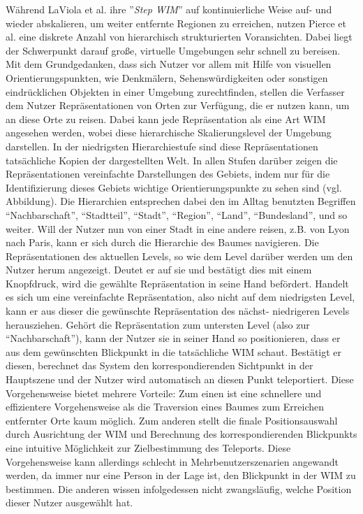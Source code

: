 Während LaViola et al. ihre ”\textit{Step WIM}” auf kontinuierliche Weise auf- und wieder abskalieren, um weiter entfernte Regionen zu erreichen, nutzen Pierce et al. \cite{pierce_representations} eine diskrete Anzahl von hierarchisch strukturierten Voransichten. Dabei liegt der Schwerpunkt darauf große, virtuelle Umgebungen sehr schnell zu bereisen.
Mit dem Grundgedanken, dass sich Nutzer vor allem mit Hilfe von visuellen Orientierungspunkten, wie Denkmälern, Sehenswürdigkeiten oder sonstigen eindrücklichen Objekten in einer Umgebung zurechtfinden, stellen die Verfasser dem Nutzer Repräsentationen von Orten zur Verfügung, die er nutzen kann, um an diese Orte zu reisen.
Dabei kann jede Repräsentation als eine Art WIM angesehen werden, wobei diese hierarchische Skalierungslevel der Umgebung darstellen. In der niedrigsten Hierarchiestufe sind diese Repräsentationen tatsächliche Kopien der dargestellten Welt. In allen Stufen darüber zeigen die Repräsentationen vereinfachte Darstellungen des Gebiets, indem nur für die Identifizierung dieses Gebiets wichtige Orientierungspunkte zu sehen sind (vgl. Abbildung).
Die Hierarchien entsprechen dabei den im Alltag benutzten Begriffen “Nachbarschaft”, “Stadtteil”, “Stadt”, “Region”, “Land”, “Bundesland”, und so weiter.
Will der Nutzer nun von einer Stadt in eine andere reisen, z.B. von Lyon nach Paris, kann er sich durch die Hierarchie des Baumes navigieren. Die Repräsentationen des aktuellen Levels, so wie dem Level darüber werden um den Nutzer herum angezeigt. Deutet er auf sie und bestätigt dies mit einem Knopfdruck, wird die gewählte Repräsentation in seine Hand befördert. Handelt es sich um eine vereinfachte Repräsentation, also nicht auf dem niedrigsten Level, kann er aus dieser die gewünschte Repräsentation des nächst- niedrigeren Levels herausziehen. 
Gehört die Repräsentation zum untersten Level (also zur “Nachbarschaft”), kann der Nutzer sie in seiner Hand so positionieren, dass er aus dem gewünschten Blickpunkt in die tatsächliche WIM schaut. Bestätigt er diesen, berechnet das System den korrespondierenden Sichtpunkt in der Hauptszene und der Nutzer wird automatisch an diesen Punkt teleportiert.
Diese Vorgehensweise bietet mehrere Vorteile: Zum einen ist eine schnellere und effizientere Vorgehensweise als die Traversion eines Baumes zum Erreichen entfernter Orte kaum möglich. Zum anderen stellt die finale Positionsauswahl durch Ausrichtung der WIM und Berechnung des korrespondierenden Blickpunkts eine intuitive Möglichkeit zur Zielbestimmung des Teleports. Diese Vorgehensweise kann allerdings schlecht in Mehrbenutzerszenarien angewandt werden, da immer nur eine Person in der Lage ist, den Blickpunkt in der WIM zu bestimmen. Die anderen wissen infolgedessen nicht zwangsläufig, welche Position dieser Nutzer ausgewählt hat.

